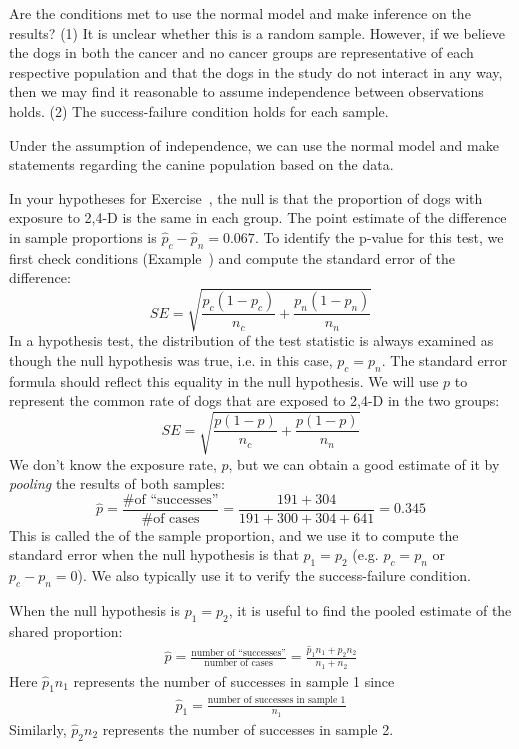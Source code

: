 \begin{example}{Are the conditions met to use the normal model and make inference on the results?}\label{condFor24DAndCancerInDogsNormalInference}
(1) It is unclear whether this is a random sample. However, if we believe the dogs in both the cancer and no cancer groups are representative of each respective population and that the dogs in the study do not interact in any way, then we may find it reasonable to assume independence between observations holds. (2) The success-failure condition holds for each sample.

Under the assumption of independence, we can use the normal model and make statements regarding the canine population based on the data.
\end{example}

In your hypotheses for Exercise~, the null is that the proportion of dogs with exposure to 2,4-D is the same in each group. The point estimate of the difference in sample proportions is $\hat{p}_c - \hat{p}_n = 0.067$. To identify the p-value for this test, we first check conditions (Example~) and compute the standard error of the difference:
$$SE = \sqrt{\frac{p_c(1-p_c)}{n_c} + \frac{p_n(1-p_n)}{n_n}}$$
In a hypothesis test, the distribution of the test statistic is always examined as though the null hypothesis was true, i.e. in this case, $p_c = p_n$. The standard error formula should reflect this equality in the null hypothesis. We will use $p$ to represent the common rate of dogs that are exposed to 2,4-D in the two groups:
$$SE = \sqrt{\frac{p(1-p)}{n_c} + \frac{p(1-p)}{n_n}}$$
We don't know the exposure rate, $p$, but we can obtain a good estimate of it by \emph{pooling} the results of both samples:
$$\hat{p} = \frac{\text{\# of ``successes''}}{\text{\# of cases}} = \frac{191 + 304}{191+300+304+641} = 0.345$$
This is called the  of the sample proportion, and we use it to compute the standard error when the null hypothesis is that $p_1 = p_2$ (e.g. $p_c = p_n$ or $p_c - p_n = 0$). We also typically use it to verify the success-failure condition.

\begin{termBox}{
When the null hypothesis is $p_1 = p_2$, it is useful to find the pooled estimate of the shared proportion:
\begin{eqnarray*}
\hat{p} = \frac{\text{number of ``successes''}}{\text{number of cases}} = \frac{\hat{p}_1n_1 + \hat{p}_2n_2}{n_1 + n_2}
\end{eqnarray*}
Here $\hat{p}_1n_1$ represents the number of successes in sample 1 since
\begin{eqnarray*}
\hat{p}_1 = \frac{\text{number of successes in sample 1}}{n_1}
\end{eqnarray*}
Similarly, $\hat{p}_2n_2$ represents the number of successes in sample 2.}
\end{termBox}

